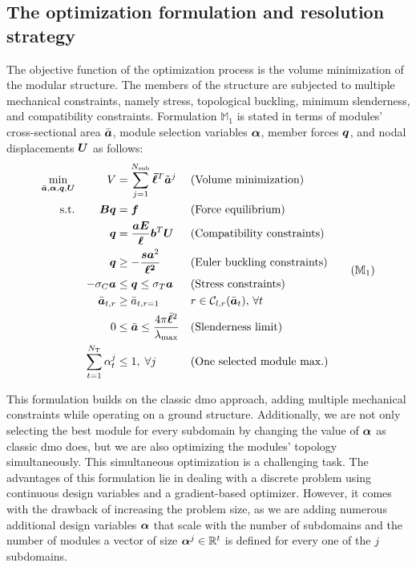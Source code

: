 \subsection{The optimization formulation and resolution strategy}
The objective function of the optimization process is the volume minimization of the modular structure. The members of the structure are subjected to multiple mechanical constraints, namely stress, topological buckling, minimum slenderness, and compatibility constraints. Formulation $\mathbb{M}_1$ is stated in terms of modules' cross-sectional area $\bar{\bm{a}}$, module selection variables $\bm{\alpha}$, member forces $\bm{q}$, and nodal displacements $\bm{U}$ as follows:
\begin{equation}
    \begin{aligned}
    \min_{\bar{\vect{a}}, \vect{\alpha}, \bm{q}, \bm{U}}   && V &= \sum_{j=1}^{N_{\text{sub}}}\vect{\bar{\ell}}^T\tilde{\vect{a}}^j && \textrm{(Volume minimization)}\\
    \textrm{s.t.}   && \bm{B}\bm{q} &= \bm{f} && \textrm{(Force equilibrium)}\\
                    && \bm{q} &= \frac{\bm{a}\bm{E}}{\bm{\ell}}\bm{b}^T\bm{U} && \textrm{(Compatibility constraints)} \\
                    && \bm{q} &\geq -\frac{\bm{s}\bm{a}^2}{\bm{\ell^2}} && \textrm{(Euler buckling constraints)} \\
                    && -\sigma_C\bm{a} &\leq \bm{q} \leq \sigma_T\bm{a} && \textrm{(Stress constraints)} \\
                    && \bar{\vect{a}}_{t,r}&\geq \bar{a}_{t,r=1} && r \in \mathcal{C}_{l,r}(\bar{\vect{a}}_t),\, \forall t \\
                    && 0 &\leq \bar{\vect{a}} \leq \frac{4 \pi \bar{\vect{\ell}}^2}{\lambda_{\text{max}}} && \textrm{(Slenderness limit)} \\
                    && \sum_{t=1}^{N_\text{T}} \alpha_t^j &\leq 1, \; \forall j && \textrm{(One selected module max.)} \\
    \end{aligned}
    \tag{$\mathbb{M}_1$}
    \label{eq:06_optim_complete}
\end{equation}

This formulation builds on the classic \gls{dmo} approach, adding multiple mechanical constraints while operating on a ground structure. Additionally, we are not only selecting the best module for every subdomain by changing the value of $\bm{\alpha}$ as classic \gls{dmo} does, but we are also optimizing the modules' topology simultaneously. This simultaneous optimization is a challenging task. The advantages of this formulation lie in dealing with a discrete problem using continuous design variables and a gradient-based optimizer. However, it comes with the drawback of increasing the problem size, as we are adding numerous additional design variables $\bm{\alpha}$ that scale with the number of subdomains and the number of modules \ie a vector of size $\bm{\alpha}^j \in \mathbb{R}^t$ is defined for every one of the $j$ subdomains.

